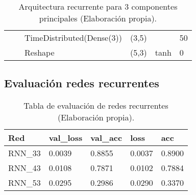 \begin{table}[H]
\begin{center}
\begin{tabular}{ll|l|l|l|l|}
\multicolumn{1}{|l|}{}                                                                 &                                   & TimeDistributed(Dense(3))          & (3,5)                                &                                          & 50                                           \\ \cline{3-6} 
\multicolumn{1}{|l|}{}                                                                 &                                   & Reshape                            & (5,3)                                & tanh                                     & 0                                           \\ \hline
\end{tabular}

\end{center}
\caption{Arquitectura recurrente para 3 componentes principales (Elaboraci\'{o}n propia).}
\label{table:rnn_3}
\end{table}

\subsection{Evaluaci\'{o}n redes recurrentes}

\begin{table}[H]
\centering
\begin{tabular}{|l|l|l|l|l|}
\hline
\textbf{Red} & \textbf{val\_loss} & \textbf{val\_acc} & \textbf{loss} & \textbf{acc} \\ \hline
RNN\_33 & 0.0039 & 0.8855 & 0.0037 & 0.8900 \\ \hline
RNN\_43 & 0.0108 & 0.7871 & 0.0102 & 0.7884 \\ \hline
RNN\_53 & 0.0295 & 0.2986 & 0.0290 & 0.3370 \\ \hline
\end{tabular}
\caption{Tabla de evaluaci\'{o}n de redes recurrentes (Elaboraci\'{o}n propia).}
\label{table:evaluacion_rnn}
\end{table}